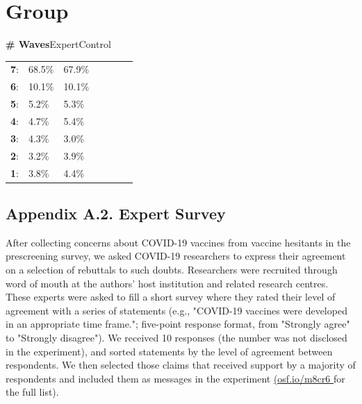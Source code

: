 \documentclass[authordate, empirical]{jote-new-article}
\begin{document}
	\section{Group}



	\textbf{\# Waves}ExpertControl

	\begin{table}
		\begin{tabularx}{\linewidth}{@{} l l l l l l l @{}}
			\hline \textbf{7}: & 68.5\% & 67.9\% \\

			 \textbf{6}: & 10.1\% & 10.1\% \\

			 \textbf{5}: & 5.2\% & 5.3\% \\

			 \textbf{4}: & 4.7\% & 5.4\% \\

			 \textbf{3}: & 4.3\% & 3.0\% \\

			 \textbf{2}: & 3.2\% & 3.9\% \\

			 \textbf{1}: & 3.8\% & 4.4\% \\


		\end{tabularx}
	\end{table}

	\subsection{Appendix A.2. Expert Survey}



	After collecting concerns about COVID-19 vaccines from vaccine hesitants in the prescreening survey, we asked COVID-19 researchers to express their agreement on a selection of rebuttals to such doubts. Researchers were recruited through word of mouth at the authors' host institution and related research centres. These experts were asked to fill a short survey where they rated their level of agreement with a series of statements (e.g., "COVID-19 vaccines were developed in an appropriate time frame."; five-point response format, from "Strongly agree" to "Strongly disagree"). We received 10 responses (the number was not disclosed in the experiment), and sorted statements by the level of agreement between respondents. We then selected those claims that received support by a majority of respondents and included them as messages in the experiment \href{https://osf.io/m8cr6/}{(osf.io/m8cr6 }for the full list).
\end{document}

